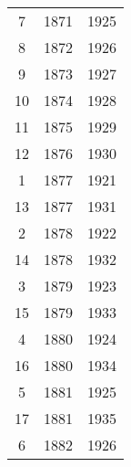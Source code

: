 % 
\begin{tabular}{ccc}
  \hline
  \hline
7 & 1871 & 1925 \\ 
  8 & 1872 & 1926 \\ 
  9 & 1873 & 1927 \\ 
  10 & 1874 & 1928 \\ 
  11 & 1875 & 1929 \\ 
  12 & 1876 & 1930 \\ 
  1 & 1877 & 1921 \\ 
  13 & 1877 & 1931 \\ 
  2 & 1878 & 1922 \\ 
  14 & 1878 & 1932 \\ 
  3 & 1879 & 1923 \\ 
  15 & 1879 & 1933 \\ 
  4 & 1880 & 1924 \\ 
  16 & 1880 & 1934 \\ 
  5 & 1881 & 1925 \\ 
  17 & 1881 & 1935 \\ 
  6 & 1882 & 1926 \\ 
   \hline
\end{tabular}
